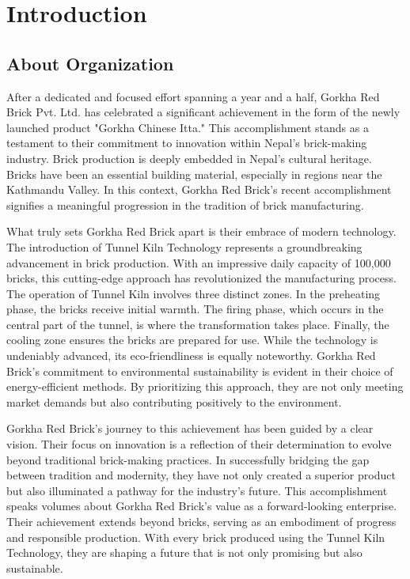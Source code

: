 \documentclass{article}
\begin{document}

\newpage




\newpage

\tableofcontents
{}

\newpage
{}

\section{Introduction}

\subsection{About Organization}
After a dedicated and focused effort spanning a year and a half, Gorkha Red Brick Pvt. Ltd. has celebrated a significant achievement in the form of the newly launched product "Gorkha Chinese Itta." This accomplishment stands as a testament to their commitment to innovation within Nepal's brick-making industry. Brick production is deeply embedded in Nepal's cultural heritage. Bricks have been an essential building material, especially in regions near the Kathmandu Valley. In this context, Gorkha Red Brick's recent accomplishment signifies a meaningful progression in the tradition of brick manufacturing.

\vspace{0.4cm}
What truly sets Gorkha Red Brick apart is their embrace of modern technology. The introduction of Tunnel Kiln Technology represents a groundbreaking advancement in brick production. With an impressive daily capacity of 100,000 bricks, this cutting-edge approach has revolutionized the manufacturing process.
The operation of Tunnel Kiln involves three distinct zones. In the preheating phase, the bricks receive initial warmth. The firing phase, which occurs in the central part of the tunnel, is where the transformation takes place. Finally, the cooling zone ensures the bricks are prepared for use.
While the technology is undeniably advanced, its eco-friendliness is equally noteworthy. Gorkha Red Brick's commitment to environmental sustainability is evident in their choice of energy-efficient methods. By prioritizing this approach, they are not only meeting market demands but also contributing positively to the environment.

\vspace{0.4cm}
Gorkha Red Brick's journey to this achievement has been guided by a clear vision. Their focus on innovation is a reflection of their determination to evolve beyond traditional brick-making practices. In successfully bridging the gap between tradition and modernity, they have not only created a superior product but also illuminated a pathway for the industry's future.
This accomplishment speaks volumes about Gorkha Red Brick's value as a forward-looking enterprise. Their achievement extends beyond bricks, serving as an embodiment of progress and responsible production. With every brick produced using the Tunnel Kiln Technology, they are shaping a future that is not only promising but also sustainable.
\end{document}
